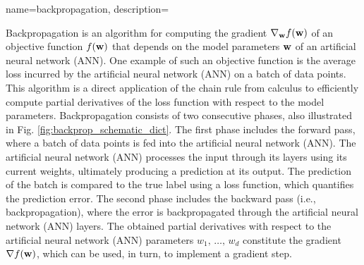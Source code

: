 { 
 {name={backpropagation},
 	description={Backpropagation is an algorithm for computing the gradient 
	 	$\nabla_{{\bf w}} f({\bf w})$ of an objective function $f({\bf w})$ that depends on the 
	  	model parameters ${\bf w}$ of an artificial neural network (ANN). One example of such an objective function 
	  	is the average loss incurred by the artificial neural network (ANN) on a batch of data points. 
	  	This algorithm is a direct application of the chain rule from calculus to 
	  	efficiently compute partial derivatives of the loss function with respect to the model parameters.
		Backpropagation consists of two consecutive phases, also illustrated in Fig. \ref{fig:backprop_schematic_dict}. 
		The first phase includes the forward pass, where a batch of 
		data points is fed into the artificial neural network (ANN). The artificial neural network (ANN) processes the input through its layers using its current 
		weights, ultimately producing a prediction at its output. The prediction of the batch is compared to 
	   	the true label using a loss function, which quantifies the prediction error. The second phase includes the 
		backward pass (i.e., backpropagation), where the error is backpropagated through the artificial neural network (ANN) layers. 
	   	The obtained partial derivatives with respect to the artificial neural network (ANN) parameters $w_{1},\,\ldots,\,w_{d}$ 
	   	constitute the gradient $\nabla f({\bf w})$, which can be used, in turn, to implement a gradient step.
	   	\begin{figure}[H]
		\centering
\end{figure}}}}

